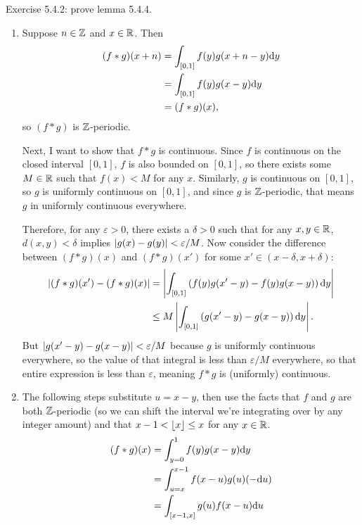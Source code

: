 \documentclass{article}
\begin{document}
\bigskip
\begin{prob}
    Exercise 5.4.2: prove lemma 5.4.4.
\end{prob}
\begin{enumerate}[label=(\alph*)]
    \item Suppose $n \in \mathbb{Z}$ and $x \in \mathbb{R}$. Then \begin{align*}
            (f*g)(x+n) &= \int_{[0,1]} f(y)g(x+n-y)\mathrm{d} y \\
                       &= \int_{[0,1]} f(y)g(x-y)\mathrm{d} y \\
                       &= (f*g)(x),
    \end{align*}
    so $(f*g)$ is $\mathbb{Z}$-periodic.
    \par
    Next, I want to show that $f*g$ is continuous. Since $f$ is continuous on the closed interval $[0,1]$, $f$ is also bounded on $[0,1]$, so there exists some $M \in \mathbb{R}$ such that $f(x)<M$ for any $x$. Similarly, $g$ is continuous on $[0, 1]$, so $g$ is uniformly continuous on $[0, 1]$, and since $g$ is $\mathbb{Z}$-periodic, that means $g$ in uniformly continuous everywhere.
    \par
    Therefore, for any $\varepsilon > 0$, there exists a $\delta > 0$ such that for any $x, y \in \mathbb{R}$, $d(x,y)<\delta$ implies $\left\lvert g(x) - g(y) \right\rvert < \varepsilon / M$. Now consider the difference between $(f*g)(x)$ and $(f*g)(x')$ for some $x' \in (x-\delta,x+\delta)$: \begin{align*}
        \left\lvert (f*g)(x')-(f*g)(x) \right\rvert &= \left\lvert  \int_{[0,1]} \left( f(y)g(x'-y) - f(y)g(x-y) \right) \mathrm{d} y  \right\rvert \\
                                 &\leq M \left\lvert  \int_{[0,1]} \left( g(x'-y)-g(x-y) \right) \mathrm{d} y  \right\rvert.
    \end{align*}
    But $\left\lvert g(x'-y)-g(x-y) \right\rvert < \varepsilon/M$ because $g$ is uniformly continuous everywhere, so the value of that integral is less than $\varepsilon/M$ everywhere, so that entire expression is less than $\varepsilon$, meaning $f*g$ is (uniformly) continuous.
\item The following steps substitute $u=x-y$, then use the facts that $f$ and $g$ are both $\mathbb{Z}$-periodic (so we can shift the interval we're integrating over by any integer amount) and that $x-1 < \left\lfloor x \right\rfloor \leq x$ for any $x \in \mathbb{R}$.
    \begin{align*}
        (f*g)(x) &= \int_{y=0}^1 f(y) g(x-y) \d y \\
                 &= \int_{u=x}^{x-1} f(x-u)g(u) (-\d u) \\
                 &= \int_{[x-1,x]} g(u)f(x-u) \d u \\

\end{align*}
\end{enumerate}
\end{document}
